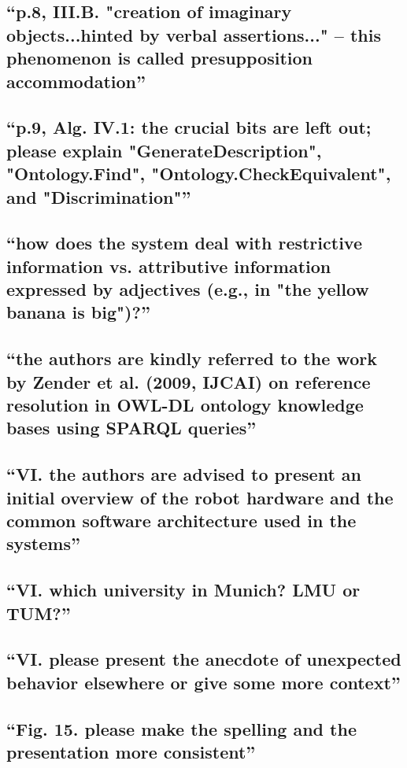 \documentclass{article}
\begin{document}
\subsection{``p.8, III.B. "creation of imaginary objects...hinted by verbal
assertions..." -- this phenomenon is called presupposition accommodation''}

\subsection{``p.9, Alg. IV.1: the crucial bits are left out; please explain
"GenerateDescription", "Ontology.Find", "Ontology.CheckEquivalent", and
"Discrimination"''}

\subsection{``how does the system deal with restrictive information vs.
attributive information expressed by adjectives (e.g., in "the yellow banana is
big")?''}

\subsection{``the authors are kindly referred to the work by Zender et al.
(2009, IJCAI) on reference resolution in OWL-DL ontology knowledge bases using
SPARQL queries''}

\subsection{``VI. the authors are advised to present an initial overview of the
robot hardware and the common software architecture used in the systems''}

\subsection{``VI. which university in Munich? LMU or TUM?''}

\subsection{``VI. please present the anecdote of unexpected behavior elsewhere
or give some more context''}

\subsection{``Fig. 15. please make the spelling and the presentation more
consistent''}
\end{document}
